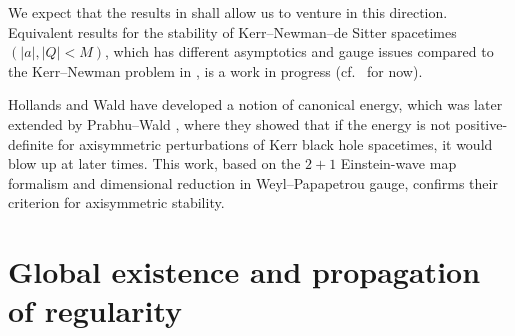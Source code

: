 \documentclass[pdftex]{sigma}
\numberwithin{equation}{section}
\begin{document}
We expect that the results in \cite{GM17_gentitle} shall allow us to venture in this direction. Equivalent results for the stability of Kerr--Newman--de Sitter spacetimes $(\vert a \vert, \vert Q \vert<M)$, which has different asymptotics and gauge issues compared to the Kerr--Newman problem in \cite{GM17_gentitle}, is a work in progress (cf.\ \cite{NG_17_2, NG_17_1} for now).


Hollands and Wald \cite{WH_13} have developed a notion of canonical energy, which was later extended by Prabhu--Wald \cite{WP_13}, where they showed that if the energy is not positive-definite for axisymmetric perturbations of Kerr black hole spacetimes, it would blow up at later times.
This work, based on the $2+1$ Einstein-wave map formalism and dimensional reduction in Weyl--Papapetrou gauge, confirms their criterion for axisymmetric stability.

\section{Global existence and propagation of regularity}\label{section6}
\end{document}

